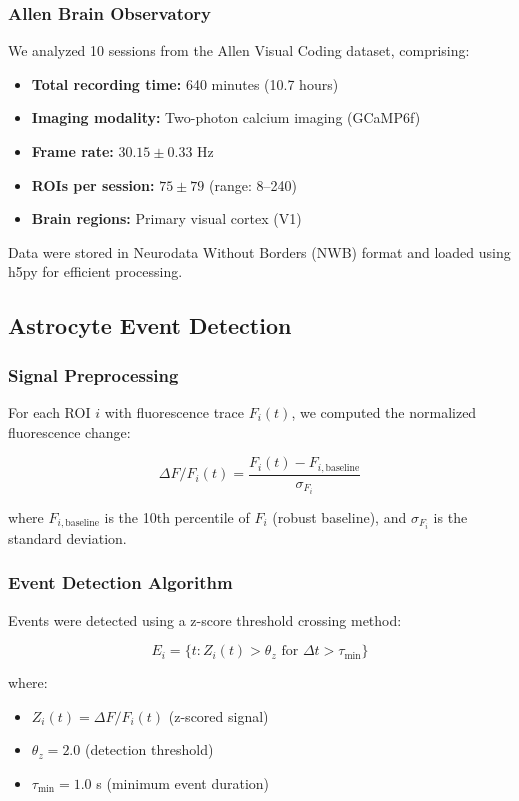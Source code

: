 \documentclass[11pt,twocolumn]{article}
\begin{document}
\subsubsection{Allen Brain Observatory}
We analyzed 10 sessions from the Allen Visual Coding dataset, comprising:
\begin{itemize}
    \item \textbf{Total recording time:} 640 minutes (10.7 hours)
    \item \textbf{Imaging modality:} Two-photon calcium imaging (GCaMP6f)
    \item \textbf{Frame rate:} $30.15 \pm 0.33$ Hz
    \item \textbf{ROIs per session:} $75 \pm 79$ (range: 8--240)
    \item \textbf{Brain regions:} Primary visual cortex (V1)
\end{itemize}

Data were stored in Neurodata Without Borders (NWB) format and loaded using h5py for efficient processing.

\subsection{Astrocyte Event Detection}

\subsubsection{Signal Preprocessing}
For each ROI $i$ with fluorescence trace $F_i(t)$, we computed the normalized fluorescence change:

\begin{equation}
\Delta F/F_i(t) = \frac{F_i(t) - F_{i,\text{baseline}}}{\sigma_{F_i}}
\end{equation}

where $F_{i,\text{baseline}}$ is the 10th percentile of $F_i$ (robust baseline), and $\sigma_{F_i}$ is the standard deviation.

\subsubsection{Event Detection Algorithm}
Events were detected using a z-score threshold crossing method:

\begin{equation}
E_i = \{t : Z_i(t) > \theta_z \text{ for } \Delta t > \tau_{\min}\}
\end{equation}

where:
\begin{itemize}
    \item $Z_i(t) = \Delta F/F_i(t)$ (z-scored signal)
    \item $\theta_z = 2.0$ (detection threshold)
    \item $\tau_{\min} = 1.0$ s (minimum event duration)
\end{itemize}
\end{document}

